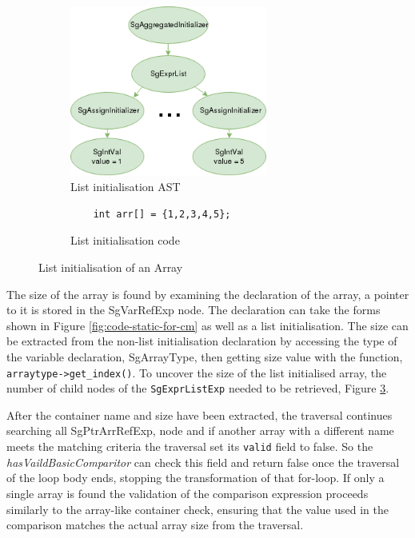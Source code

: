 \documentclass[bsc,frontabs,singlespacing,twoside,parskip,deptreport]{infthesis}
\begin{document}
\begin{figure}[H]
    \begin{subfigure}[b]{0.5\textwidth}
        \centering
        \includegraphics[height=5.6cm]{images/init-list.png}
        \caption{List initialisation AST}
        \label{fig:list-init-AST-var}
    \end{subfigure}
    \hfill
    \begin{subfigure}[b]{0.5\textwidth}
        \centering
        \begin{verbatim}
    int arr[] = {1,2,3,4,5};
        \end{verbatim}
        \caption{List initialisation code}
        \label{fig:list-init-var-code}
    \end{subfigure}
    \vspace{-0.5cm}
    \caption{List initialisation of an Array}
    \label{fig:list-init-var}
\end{figure}

The size of the array is found by examining the declaration of the array, a pointer to it is stored in the SgVarRefExp node. The declaration can take the forms shown in Figure \ref{fig:code-static-for-cm} as well as a list initialisation. The size can be extracted from the non-list initialisation declaration by accessing the type of the variable declaration, SgArrayType, then getting size value with the function, \texttt{arraytype->get\_index()}. To uncover the size of the list initialised array, the number of child nodes of the \texttt{SgExprListExp} needed to be retrieved, Figure \ref{fig:list-init-var}. 

After the container name and size have been extracted, the traversal continues searching all SgPtrArrRefExp, node and if another array with a different name meets the matching criteria the traversal set its \texttt{valid} field to false. So the \textit{hasVaildBasicComparitor} can check this field and return false once the traversal of the loop body ends, stopping the transformation of that for-loop. If only a single array is found the validation of the comparison expression proceeds similarly to the array-like container check, ensuring that the value used in the comparison matches the actual array size from the traversal.  
\end{document}
